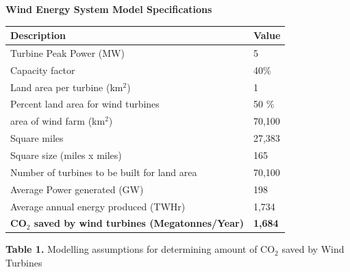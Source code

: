 \documentclass[11pt]{article}
\begin{document}
\begin{center}
{\bf Wind Energy System Model Specifications}

\begin{tabular}{|l|l|}
\hline
\cellcolor{gray!35} {\bf Description} & \cellcolor{gray!35} {\bf Value} \\
\hline
Turbine Peak Power (MW) & 5 \\
\hline
Capacity factor & 40\% \\
\hline
Land area per turbine (km$^2$) & 1 \\
\hline
Percent land area for wind turbines & 50 \% \\
\hline
area of wind farm (km$^2$) & 70,100 \\
\hline
\hspace{18em} Square miles & 27,383 \\
\hline
\hspace{12em} Square size (miles x miles) & 165 \\
\hline
Number of turbines to be built for land area & 70,100 \\
\hline
Average Power generated (GW) & 198 \\
\hline
Average annual energy produced (TWHr) & 1,734 \\
\hline 
{\bf CO$_2$ saved by wind turbines (Megatonnes/Year)} & {\bf 1,684} \\
\hline
\end{tabular}
\end{center}
\begin{center}
{\bf Table 1.} Modelling assumptions for determining amount of CO$_2$ saved by Wind Turbines
\end{center}
\end{document}
